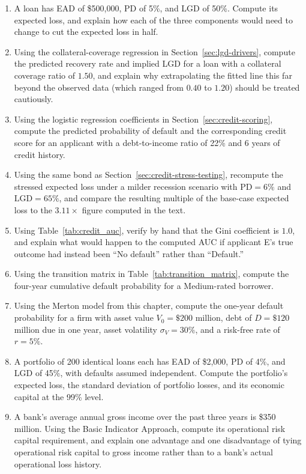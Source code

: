 \documentclass[../ai_in_finance]{subfiles}
\begin{document}
\begin{enumerate}
    \item A loan has EAD of \$500,000, PD of 5\%, and LGD of 50\%. Compute its expected loss, and explain how each of the three components would need to change to cut the expected loss in half.
    \item Using the collateral-coverage regression in Section~\ref{sec:lgd-drivers}, compute the predicted recovery rate and implied LGD for a loan with a collateral coverage ratio of $1.50$, and explain why extrapolating the fitted line this far beyond the observed data (which ranged from $0.40$ to $1.20$) should be treated cautiously.
    \item Using the logistic regression coefficients in Section~\ref{sec:credit-scoring}, compute the predicted probability of default and the corresponding credit score for an applicant with a debt-to-income ratio of 22\% and 6 years of credit history.
    \item Using the same bond as Section~\ref{sec:credit-stress-testing}, recompute the stressed expected loss under a milder recession scenario with $\text{PD}=6\%$ and $\text{LGD}=65\%$, and compare the resulting multiple of the base-case expected loss to the $3.11\times$ figure computed in the text.
    \item Using Table~\ref{tab:credit_auc}, verify by hand that the Gini coefficient is $1.0$, and explain what would happen to the computed AUC if applicant E's true outcome had instead been ``No default'' rather than ``Default.''
    \item Using the transition matrix in Table~\ref{tab:transition_matrix}, compute the four-year cumulative default probability for a Medium-rated borrower.
    \item Using the Merton model from this chapter, compute the one-year default probability for a firm with asset value $V_0=\$200$ million, debt of $D=\$120$ million due in one year, asset volatility $\sigma_V=30\%$, and a risk-free rate of $r=5\%$.
    \item A portfolio of 200 identical loans each has EAD of \$2,000, PD of 4\%, and LGD of 45\%, with defaults assumed independent. Compute the portfolio's expected loss, the standard deviation of portfolio losses, and its economic capital at the 99\% level.
    \item A bank's average annual gross income over the past three years is \$350 million. Using the Basic Indicator Approach, compute its operational risk capital requirement, and explain one advantage and one disadvantage of tying operational risk capital to gross income rather than to a bank's actual operational loss history.

\end{enumerate}
\end{document}
